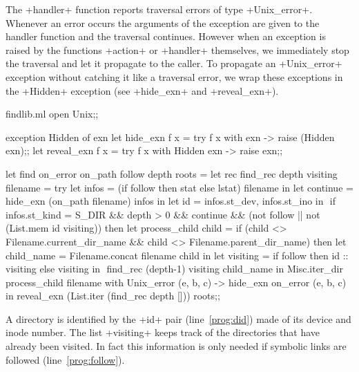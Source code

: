 The \ml+handler+ function reports traversal errors of type
\ml+Unix_error+. Whenever an error occurs the arguments of the
exception are given to the handler function and the traversal
continues. However when an exception is raised by the functions
\ml+action+ or \ml+handler+ themselves, we immediately stop the
traversal and let it propagate to the caller. To propagate an
\ml+Unix_error+ exception without catching it like a traversal error,
we wrap these exceptions in the \ml+Hidden+ exception (see
\ml+hide_exn+ and \ml+reveal_exn+).
%
\begin{listingcodefile}[style=numbers]{findlib.ml}
open Unix;;

exception Hidden of exn
let hide_exn f x = try f x with exn -> raise (Hidden exn);;
let reveal_exn f x = try f x with Hidden exn -> raise exn;;

let find on_error on_path follow depth roots =
  let rec find_rec depth visiting filename =
    try
      let infos = (if follow then stat else lstat) filename in
      let continue = hide_exn (on_path filename) infos in
      let id = infos.st_dev, infos.st_ino in $\label{prog:did}$
      if infos.st_kind = S_DIR && depth > 0 && continue &&
        (not follow || not (List.mem id visiting))
      then
        let process_child child = 
          if (child <> Filename.current_dir_name &&
              child <> Filename.parent_dir_name) then 
            let child_name = Filename.concat filename child in
            let visiting = 
              if follow then id :: visiting else visiting in $\label{prog:follow}$
            find_rec (depth-1) visiting child_name in
        Misc.iter_dir process_child filename 
    with Unix_error (e, b, c) -> hide_exn on_error (e, b, c) in
  reveal_exn (List.iter (find_rec depth [])) roots;;
\end{listingcodefile}

A directory is identified by the \ml+id+ pair (line~\ref{prog:did})
made of its device and inode number.  The list \ml+visiting+ keeps
track of the directories that have already been visited. In fact
this information is only needed if symbolic links are followed
(line~\ref{prog:follow}).

